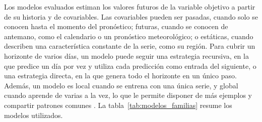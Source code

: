 Los modelos evaluados estiman los valores futuros de la variable objetivo a partir de su historia y de covariables. Las covariables pueden ser pasadas, cuando solo se conocen hasta el momento del pronóstico; futuras, cuando se conocen de antemano, como el calendario o un pronóstico meteorológico; o estáticas, cuando describen una característica constante de la serie, como su región. Para cubrir un horizonte de varios días, un modelo puede seguir una estrategia recursiva, en la que predice un día por vez y utiliza cada predicción como entrada del siguiente, o una estrategia directa, en la que genera todo el horizonte en un único paso. Además, un modelo es local cuando se entrena con una única serie, y global cuando aprende de varias a la vez, lo que le permite disponer de más ejemplos y compartir patrones comunes \cite{monteromanso2021global}. La tabla~\ref{tab:modelos_familias} resume los modelos utilizados.

